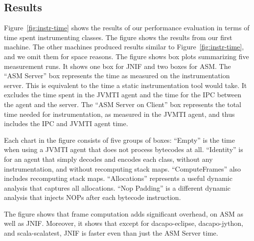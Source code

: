 \subsection{Results}

Figure~\ref{fig:instr-time} shows the results of our performance evaluation
in terms of time spent instrumenting classes.
The figure shows the results from our first machine.
The other machines produced results similar to Figure~\ref{fig:instr-time}, 
and we omit them for space reasons.
The figure shows box plots summarizing five measurement runs.
It shows one box for JNIF and two boxes for ASM.
The ``ASM Server'' box represents the time as measured on the instrumentation server.
This is equivalent to the time a static instrumentation tool would take.
It excludes the time spent in the JVMTI agent and the time for the IPC between the agent and the server.
The ``ASM Server on Client'' box represents the total time needed for instrumentation, 
as measured in the JVMTI agent,
and thus includes the IPC and JVMTI agent time.

Each chart in the figure consists of five groups of boxes:
``Empty'' is the time when using a JVMTI agent that does not process bytecodes at all.
``Identity'' is for an agent that simply decodes and encodes each class, without any instrumentation, and without recomputing stack maps.
``ComputeFrames'' also includes recomputing stack maps.
``Allocations'' represents a useful dynamic analysis that captures all allocations.
``Nop Padding'' is a different dynamic analysis that injects NOPs after each bytecode instruction. 

The figure shows that frame computation adds significant overhead, on ASM as well as JNIF.
Moreover, it shows that except for dacapo-eclipse, dacapo-jython, and scala-scalatest,
JNIF is faster even than just the ASM Server time.





